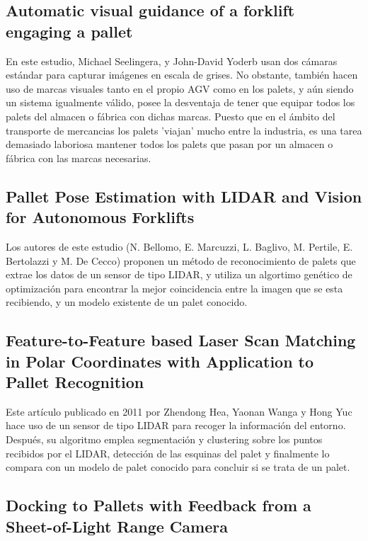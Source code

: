 \subsection{Automatic visual guidance of a forklift engaging a pallet \cite{art1:SEELINGER20061026}}
En este estudio, Michael Seelingera, y John-David Yoderb usan dos cámaras estándar para capturar imágenes en escala de grises.
No obstante, también hacen uso de marcas visuales tanto en el propio AGV como en los palets, y aún siendo un sistema igualmente válido, posee la desventaja de tener que equipar todos los palets del almacen o fábrica con dichas marcas. Puesto que en el ámbito del transporte de mercancias los palets 'viajan' mucho entre la industria, es una tarea demasiado laboriosa mantener todos los palets que pasan por un almacen o fábrica con las marcas necesarias.

\subsection{Pallet Pose Estimation with LIDAR and Vision for Autonomous Forklifts  \cite{art2:BELLOMO2009612}}
Los autores de este estudio (N. Bellomo, E. Marcuzzi, L. Baglivo, M. Pertile, E. Bertolazzi y M. De Cecco) proponen un método de reconocimiento de palets que extrae los datos de un sensor de tipo LIDAR, y utiliza un algortimo genético de optimización para encontrar la mejor coincidencia entre la imagen que se esta recibiendo, y un modelo existente de un palet conocido.

\subsection{Feature-to-Feature based Laser Scan Matching in Polar Coordinates with Application to Pallet Recognition \cite{art3:HE20114800}}
Este artículo publicado en 2011 por Zhendong Hea, Yaonan Wanga y Hong Yuc hace uso de un sensor de tipo LIDAR para recoger la información del entorno.
Después, su algoritmo emplea segmentación y clustering sobre los puntos recibidos por el LIDAR, detección de las esquinas del palet y finalmente lo compara con un modelo de palet conocido para concluir si se trata de un palet.

\subsection{Docking to Pallets with Feedback from a Sheet-of-Light Range Camera\cite{art6:895241}}

